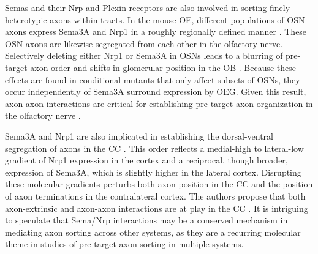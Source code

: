 Semas and their Nrp and Plexin receptors are also involved in sorting finely heterotypic axons within tracts.
In the mouse OE, different populations of OSN axons express Sema3A and Nrp1 in a roughly regionally defined manner \cite{imai2009pre}.
These OSN axons are likewise segregated from each other in the olfactory nerve.
Selectively deleting either Nrp1 or Sema3A in OSNs leads to a blurring of pre-target axon order and shifts in glomerular position in the OB \cite{imai2009pre}.
Because these effects are found in conditional mutants that only affect subsets of OSNs, they occur independently of Sema3A surround expression by OEG.
Given this result, axon-axon interactions are critical for establishing pre-target axon organization in the olfactory nerve \cite{imai2009pre}.

Sema3A and Nrp1 are also implicated in establishing the dorsal-ventral segregation of axons in the CC \cite{zhou2013axon}.
This order reflects a medial-high to lateral-low gradient of Nrp1 expression in the cortex and a reciprocal, though broader, expression of Sema3A, which is slightly higher in the lateral cortex.
Disrupting these molecular gradients perturbs both axon position in the CC and the position of axon terminations in the contralateral cortex.
The authors propose that both axon-extrinsic and axon-axon interactions are at play in the CC \cite{zhou2013axon}.
It is intriguing to speculate that Sema/Nrp interactions may be a conserved mechanism in mediating axon sorting across other systems, as they are a recurring molecular theme in studies of pre-target axon sorting in multiple systems.